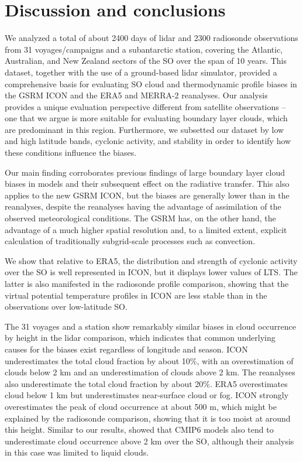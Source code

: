 \documentclass[draft]{agujournal2019}
\begin{document}
\section{Discussion and conclusions}

We analyzed a total of about 2400 days of lidar and 2300 radiosonde observations from 31 voyages/campaigns and a subantarctic station, covering the Atlantic, Australian, and New Zealand sectors of the SO over the span of 10 years. This dataset, together with the use of a ground-based lidar simulator, provided a comprehensive basis for evaluating SO cloud and thermodynamic profile biases in the GSRM ICON and the ERA5 and MERRA-2 reanalyses. Our analysis provides a unique evaluation perspective different from satellite observations -- one that we argue is more suitable for evaluating boundary layer clouds, which are predominant in this region. Furthermore, we subsetted our dataset by low and high latitude bands, cyclonic activity, and stability in order to identify how these conditions influence the biases.

Our main finding corroborates previous findings of large boundary layer cloud biases in models and their subsequent effect on the radiative transfer. This also applies to the new GSRM ICON, but the biases are generally lower than in the reanalyses, despite the reanalyses having the advantage of assimilation of the observed meteorological conditions. The GSRM has, on the other hand, the advantage of a much higher spatial resolution and, to a limited extent, explicit calculation of traditionally subgrid-scale processes such as convection.

We show that relative to ERA5, the distribution and strength of cyclonic activity over the SO is well represented in ICON, but it displays lower values of LTS. The latter is also manifested in the radiosonde profile comparison, showing that the virtual potential temperature profiles in ICON are less stable than in the observations over low-latitude SO.

The 31 voyages and a station show remarkably similar biases in cloud occurrence by height in the lidar comparison, which indicates that common underlying causes for the biases exist regardless of longitude and season. ICON underestimates the total cloud fraction by about 10\%, with an overestimation of clouds below 2 km and an underestimation of clouds above 2 km. The reanalyses also underestimate the total cloud fraction by about 20\%. ERA5 overestimates cloud below 1 km but underestimates near-surface cloud or fog. ICON strongly overestimates the peak of cloud occurrence at about 500 m, which might be explained by the radiosonde comparison, showing that it is too moist at around this height. Similar to our results,  showed that CMIP6 models also tend to underestimate cloud occurrence above 2 km over the SO, although their analysis in this case was limited to liquid clouds.
\end{document}
